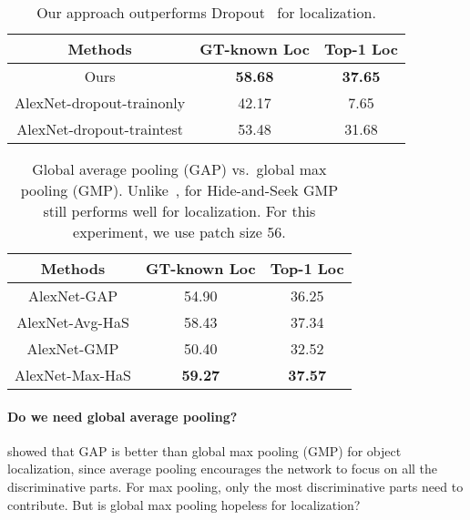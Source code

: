 \documentclass[10pt,twocolumn,letterpaper]{article}
\begin{document}
\begin{table}[t!]
            \begin{center}
                \footnotesize
                \begin{tabular}{| c | c | c|}
                \hline    	
                Methods & GT-known Loc &  Top-1 Loc \\
                \hline

                Ours      &     \textbf{58.68} & \textbf{37.65}  \\
                AlexNet-dropout-trainonly            & 42.17 & 7.65  \\
                AlexNet-dropout-traintest           &  53.48  & 31.68  \\

                \hline
                 \end{tabular}
                        \caption{Our approach outperforms Dropout~\cite{srivastava-jmlr2014} for localization.}
                        \label{table:dropout_results}
                        \end{center}
                        \vspace*{-0.15in}
                        \end{table}\begin{table}[t!]
        \begin{center}
            \footnotesize
            \begin{tabular}{| c | c | c|}
            \hline    	
            Methods & GT-known Loc &  Top-1 Loc \\
            \hline
            AlexNet-GAP            & 54.90 & 36.25 \\
            AlexNet-Avg-HaS            & 58.43 & 37.34   \\
            AlexNet-GMP            & 50.40 & 32.52  \\
            AlexNet-Max-HaS            & \textbf{59.27} &  \textbf{37.57}  \\

            \hline
             \end{tabular}
                    \caption{Global average pooling (GAP) vs.~global max pooling (GMP).  Unlike~\cite{zhou-cvpr2016}, for Hide-and-Seek GMP still performs well for localization. For this experiment, we use patch size 56.}
                    \label{table:max_results}
                    \end{center}
                    \vspace*{-0.15in}
                    \end{table}\vspace{-10pt}\paragraph{Do we need global average pooling?}\cite{zhou-cvpr2016} showed that GAP is better than global max pooling (GMP) for object localization, since average pooling encourages the network to focus on all the discriminative parts.  For max pooling, only the most discriminative parts need to contribute. But is global max pooling hopeless for localization?
\end{document}

